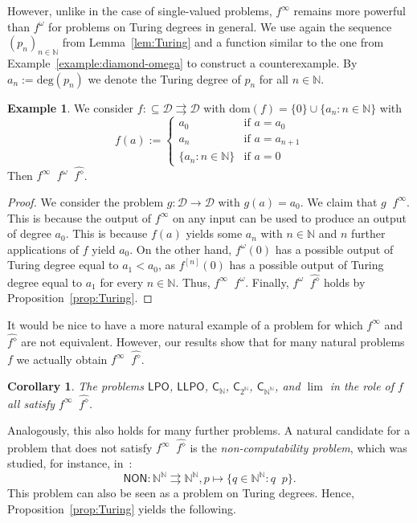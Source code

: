 \documentclass[11pt,a4paper]{amsart}
\theoremstyle{plain}
\newtheorem{cor}[thm]{Corollary}
\theoremstyle{definition}
\newtheorem{exa}[thm]{Example}
\theoremstyle{defC}
\theoremstyle{thmC}
\theoremstyle{plain}
\numberwithin{equation}{section}
\def\NON{\mathsf{NON}}
\def\deg{\mathrm{deg}}
\def\DD{{\mathcal D}}
\def\IN{{\mathbb{N}}}
\def\In{\subseteq}
\def\mto{\rightrightarrows}
\def\C{{\mathsf{{C}}}}
\def\LPO{\mathsf{LPO}}
\def\LLPO{\mathsf{LLPO}}
\def\C{\mathsf{C}}
\def\nleqT{\mathop{\not\leq_{\mathrm{T}}}}
\def\leqW{\mathop{\leq_{\mathrm{W}}}}
\def\equivSW{\mathop{\equiv_{\mathrm{sW}}}}
\def\nleqW{\mathop{\not\leq_{\mathrm{W}}}}
\def\leqW{\mathop{\leq_{\mathrm{W}}}}
\def\equivSW{\mathop{\equiv_{\mathrm{sW}}}}
\def\nleqW{\mathop{\not\leq_{\mathrm{W}}}}
\def\dom{{\mathrm{dom}}}
\begin{document}
\noindent
However, unlike in the case of single-valued problems, $f^\infty$ remains more powerful
than $f^\omega$ for problems on Turing degrees in general.
We use again the sequence $(p_n)_{n\in\IN}$ from Lemma~\ref{lem:Turing} and a function similar to the
one from Example~\ref{example:diamond-omega} to construct a counterexample.
By $a_n:=\deg(p_n)$ we denote the Turing degree of $p_n$ for all $n\in\IN$.

\begin{exa}
\label{example:infty-omega}
We consider $f:\In\DD\mto\DD$
with $\dom(f)=\{0\}\cup\{a_n:n\in\IN\}$ with
\[f(a):=\left\{\begin{array}{ll}
a_0 & \mbox{if $a=a_0$}\\
a_n & \mbox{if $a=a_{n+1}$}\\
\{a_n:n\in\IN\} & \mbox{if $a=0$}
\end{array}\right.\]
Then $f^\infty\nleqW f^\omega\equivSW\widehat{f^\diamond}$.
\end{exa}
\begin{proof}
We consider the problem $g:\DD\to\DD$ with $g(a)=a_0$. We claim that $g\leqW f^\infty$.
This is because the output of $f^\infty$ on any input can be used to produce an output of 
degree $a_0$.
This is because $f(a)$ yields some $a_n$ with $n\in\IN$ and $n$ further applications of $f$ yield $a_0$.
On the other hand, $f^\omega(0)$ has
a possible output of Turing degree equal to $a_1<a_0$, as $f^{[n]}(0)$ has a possible output
of Turing degree equal to $a_{1}$ for every $n\in\IN$. 
Thus, $f^\infty\nleqW f^\omega$. Finally, $f^\omega\equivSW\widehat{f^\diamond}$ holds by Proposition~\ref{prop:Turing}.
\end{proof}

\noindent
It would be nice to have a more natural example of a problem for which $f^\infty$ and $\widehat{f^\diamond}$
are not equivalent. However, our results show that for many natural problems $f$ we actually obtain 
$f^\infty\equivSW\widehat{f^\diamond}$.

\begin{cor}
The problems $\LPO$, $\LLPO$, $\C_\IN$, $\C_{2^\IN}$, $\C_{\IN^\IN}$, and $\lim$
in the role of $f$ all satisfy $f^\infty\equivSW\widehat{f^\diamond}$.
 \end{cor}

\noindent
Analogously, this also holds for many further problems.
A natural candidate for a problem that does not satisfy $f^\infty\equivSW\widehat{f^\diamond}$
is the {\em non-computability problem}, which was studied,
for instance, in~\cite{BHK17a,Bra23}:
\[\NON:\IN^\IN\mto\IN^\IN,p\mapsto\{q\in\IN^\IN:q\nleqT p\}.\]
This problem can also be seen as a problem on Turing degrees.
Hence, Proposition~\ref{prop:Turing} yields the following.
\end{document}
